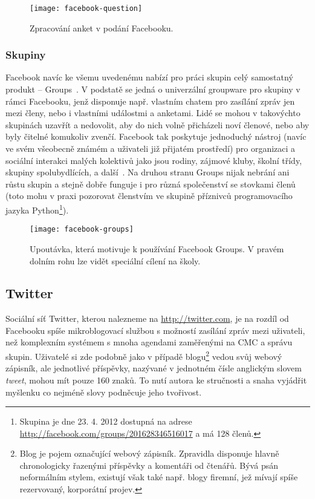 \documentclass[12pt,oneside,final]{fithesis2}
\begin{document}
\begin{figure}[H]
    \texttt{[image: facebook-question]}
    \caption{Zpracování anket v podání Facebooku.}
\end{figure}

\subsubsection*{Skupiny}
Facebook navíc ke všemu uvedenému nabízí pro práci skupin celý samostatný produkt -- Groups~\cite{chai2010new}. V podstatě se jedná o univerzální groupware pro skupiny v rámci Facebooku, jenž disponuje např. vlastním chatem pro zasílání zpráv jen mezi členy, nebo i vlastními událostmi a anketami. Lidé se mohou v takovýchto skupinách uzavřít a nedovolit, aby do nich volně přicházeli noví členové, nebo aby byly čitelné komukoliv zvenčí. Facebook tak poskytuje jednoduchý nástroj (navíc ve svém všeobecně známém a uživateli již přijatém prostředí) pro organizaci a sociální interakci malých kolektivů jako jsou rodiny, zájmové kluby, školní třídy, skupiny spolubydlících, a další~\cite{novati2012introducing}. Na druhou stranu Groups nijak nebrání ani růstu skupin a stejně dobře funguje i pro různá společenství se stovkami členů (toto mohu v praxi pozorovat členstvím ve skupině příznivců programovacího jazyka Python\footnote{Skupina je dne 23. 4. 2012 dostupná na adrese \url{http://facebook.com/groups/201628346516017} a má 128 členů.}).

\begin{figure}[H]
    \texttt{[image: facebook-groups]}
    \caption{Upoutávka, která motivuje k používání Facebook Groups. V pravém dolním rohu lze vidět speciální cílení na školy.}
\end{figure}

\subsection{Twitter}\label{twitter}
Sociální síť Twitter, kterou nalezneme na \url{http://twitter.com}, je na rozdíl od Facebooku spíše mikroblogovací službou s možností zasílání zpráv mezi uživateli, než komplexním systémem s mnoha agendami zaměřenými na CMC a správu skupin. Uživatelé si zde podobně jako v případě blogu\footnote{Blog je pojem označující webový zápisník. Zpravidla disponuje hlavně chronologicky řazenými příspěvky a komentáři od čtenářů. Bývá psán neformálním stylem, existují však také např. blogy firemní, jež mívají spíše rezervovaný, korporátní projev.} vedou svůj webový zápisník, ale jednotlivé příspěvky, nazývané v jednotném čísle anglickým slovem \emph{tweet}, mohou mít pouze 160 znaků. To nutí autora ke stručnosti a snaha vyjádřit myšlenku co nejméně slovy podněcuje jeho tvořivost.
\end{document}
